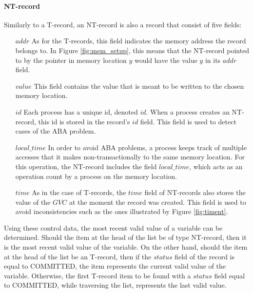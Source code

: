 \documentclass[11pt,letterpaper]{article}
\begin{document}
\paragraph{NT-record}
Similarly to a T-record, an NT-record is also a record that consist 
of five fields:
\begin{itemize}
\vspace{-0.1cm}
\item[$\mathit{addr}$]
As for  the T-records, this field  indicates the memory  address the record
belongs  to.  In  Figure  \ref{fig:mem_setup},  this  means  that  the
NT-record pointed to by the   pointer in memory location $\mathit{y}$ would
have the value $\mathit{y}$ in its $\mathit{addr}$ field. 
\vspace{-0.2cm}
\item[$\mathit{value}$]
This field contains the value that is meant to be written to the chosen 
memory location.
\vspace{-0.2cm}
\item[$\mathit{id}$]
Each process has a unique id, denoted $\mathit{id}$. When a 
process creates an NT-record, this id is  stored in
 the  record{}'s $\mathit{id}$ field. 
This  field is used to detect cases of the ABA problem.
\vspace{-0.2cm}
\item[$\mathit{local\_time}$]
In order to avoid ABA problems, a process keeps track of multiple accesses 
that it  makes non-transactionally  to the same  memory location.  For this
operation,  the NT-record includes the field $\mathit{local\_time}$,
 which acts as an operation count by  a process on the memory location. 
\vspace{-0.2cm}
\item[$\mathit{time}$]
As in the case of T-records, the $\mathit{time}$ field of NT-records 
also stores the value 
of the $\mathit{GVC}$ at the moment the record was created. This field is 
used to avoid inconsistencies such as the ones illustrated by Figure 
\ref{fig:timent}. 
\end{itemize}

Using these control data, the most  recent valid value  of a variable  can be
determined.  Should the item at the  head of the list be of type NT-record,
then it is the most  
recent valid value  of the variable. On the other hand,  should the item at
the head of   the list be an  T-record, then if the $\mathit{status}$ field of
the record is equal to COMMITTED,  
the item represents the current valid value of the variable. Otherwise, the
first T-record  
item to  be found  with a  $\mathit{status}$ field  equal to  COMMITTED, while
traversing the list,  represents the last valid value. 
\end{document}
